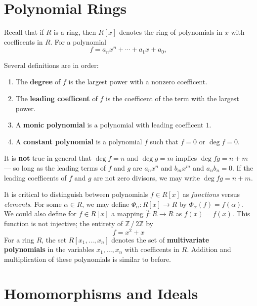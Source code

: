 \documentclass[11pt]{article}
\begin{document}

\section{Polynomial Rings}

Recall that if $R$ is a ring, then $R[x]$ denotes the ring of polynomials in $x$ with coefficents in $R$. For a  polynomial
\[
	f = a_{n} x^{n} + \cdots + a_{1}x + a_{0},
\]

\newpage

Several definitions are in order:
\begin{enumerate}
	\item The \textbf{degree} of $f$ is the largest power with a nonzero coefficent.
	\item The \textbf{leading coefficent} of $f$ is the coefficent of the term with the largest power.
	\item A \textbf{monic polynomial} is a polynomial with leading coefficent $1$.
	\item A \textbf{constant polynomial} is a polynomial $f$ such that $f = 0$ or $\deg f = 0$.
\end{enumerate} 

It is \textbf{not} true in general that $\deg f = n$ and $\deg g = m$ implies $\deg fg = n + m$ --- so long as the leading terms of $f$ and $g$ are $a_{n}x^{n}$ and $b_{m}x^{m}$ and $a_{n}b_{n} = 0$. If the leading coefficents of $f$ and $g$ are not zero divisors, we may write $\deg fg = n + m$.

It is critical to distinguish between polynomials $f \in R[x]$ as \textit{functions} versus \textit{elements}. For some $\alpha \in R$, we may define $\Phi_{\alpha} : R[x] \to R$ by $\Phi_{\alpha}(f) = f(\alpha)$. We could also define for $f \in R[x]$ a mapping $\hat{f} : R \to R$ as $\hat{f}(x) = f(x)$. This function is not injective; the entirety of $\mathbb{Z} \,/\, 2 \mathbb{Z}$ by 
\[
	f = x^{2} + x
\]
For a ring $R$, the set $R[x_{1}, \ldots, x_{n}]$ denotes the set of \textbf{multivariate polynomials} in the variables $x_{1}, \ldots, x_{n}$ with coefficents in $R$. Addition and multiplication of these polynomials is similar to before.


\section{Homomorphisms and Ideals}
\end{document}
